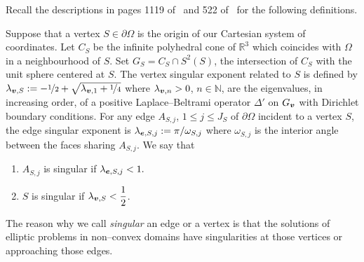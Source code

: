 Recall the descriptions in pages 1119 of~\cite{alw} and 522 of~\cite{apelNicaise} for the following 
definitions. 
\begin{defi}
Suppose that a vertex
$S\in\partial\Omega$ is the origin of our Cartesian system of coordinates. Let $C_{S}$ be the infinite
polyhedral cone of $\mathbb{R}^3$ which coincides with $\Omega$ in a neighbourhood of 
$S$. Set $G_{S} = C_{S}\cap S^2(S)$, the intersection of $C_{S}$ with
the unit sphere centered at $S$. The vertex singular exponent related to $S$
is defined by $\lambda_{\boldsymbol{v},S} := -\nicefrac12 + \sqrt{\lambda_{\boldsymbol{v},1} + \nicefrac14}$
where 
$\lambda_{\boldsymbol{v},n} > 0$, $n\in\mathbb{N}$, are the eigenvalues, in increasing order, of a positive
Laplace--Beltrami operator $\Delta'$ on $G_{\boldsymbol{v}}$ with Dirichlet boundary
conditions. For any edge $A_{S,j}$, $1\leqslant j\leqslant J_S$
of $\partial\Omega$ incident to a vertex $S$, the edge
singular exponent is 
$\lambda_{\boldsymbol{e},S,j} := \pi/\omega_{S,j}$ where $\omega_{S,j}$ is the interior angle between
the faces sharing  $A_{S,j}$.
We say that
  \begin{enumerate}
    \item $A_{S,j}$ is singular if $\lambda_{\boldsymbol{e},S,j} < 1.$ 
    \item $S$ is singular if $\lambda_{\boldsymbol{v},S} < \dfrac12$.
  \end{enumerate}
\end{defi}
The reason why we call \textsl{singular} an edge or a vertex is that
the solutions of elliptic problems in non--convex domains have singularities
at those vertices or approaching those edges.

